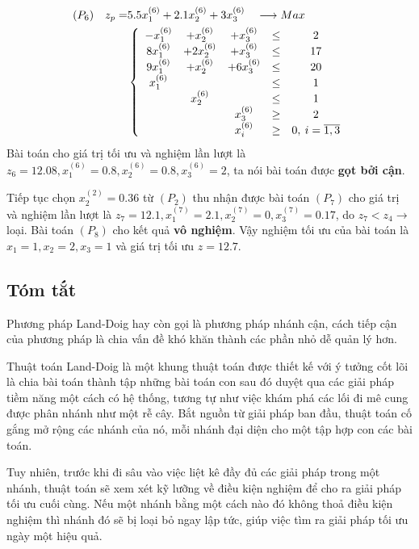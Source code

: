 \documentclass[12pt,a4paper]{report}
\begin{document}
    \begin{equation*}
      \begin{split}
          (P_6) \quad z_p= & 5.5x^{(6)}_1 + 2.1x^{(6)}_2 + 3x^{(6)}_3 \quad \longrightarrow Max \\
          & \left\{\begin{array} {ccccc}
           -x^{(6)}_1 &+ x^{(6)}_2 &+ x^{(6)}_3 &\leq& 2 \\
           8x^{(6)}_1 &+ 2x^{(6)}_2 &+ x^{(6)}_3&\leq &17 \\
           9x^{(6)}_1 &+ x^{(6)}_2 &+ 6x^{(6)}_3 &\leq& 20 \\
           x^{(6)}_1&& &\leq& 1 \\
           &x^{(6)}_2& &\leq& 1 \\
           &&x^{(6)}_3& \geq &2 \\
          &&x^{(6)}_i &\geq &0 , \: i=\overline{\rm 1 ,3} \\
          \end{array}\right. \\
      \end{split}
    \end{equation*}
    Bài toán cho giá trị tối ưu và nghiệm lần lượt là  $z_6=12.08, x^{(6)}_1=0.8, x^{(6)}_2=0.8, x^{(6)}_3=2$, ta nói bài toán được \textbf{gọt bởi cận}.
    
Tiếp tục chọn $x^{(2)}_2=0.36$ từ $(P_2)$ thu nhận được bài toán $(P_7)$ cho giá trị và nghiệm lần lượt là $z_7=12.1, x^{(7)}_1=2.1, x^{(7)}_2=0, x^{(7)}_3=0.17$, do $z_7<z_4 \rightarrow$ loại. Bài toán $(P_8)$ cho kết quả \textbf{vô nghiệm}. Vậy nghiệm tối ưu của bài toán là $x_1=1, x_2=2, x_3=1$ và giá trị tối ưu $z=12.7$.
\subsection*{Tóm tắt}
Phương pháp Land-Doig hay còn gọi là phương pháp nhánh cận, cách tiếp cận của phương pháp là chia vấn đề khó khăn thành các phần nhỏ dễ quản lý hơn.

Thuật toán Land-Doig là một khung thuật toán được thiết kế với ý tưởng cốt lõi là chia bài toán thành tập những bài toán con sau đó duyệt qua các giải pháp tiềm năng một cách có hệ thống, tương tự như việc khám phá các lối đi mê cung được phân nhánh như một rễ cây. Bắt nguồn từ giải pháp ban đầu, thuật toán cố gắng mở rộng các nhánh của nó, mỗi nhánh đại diện cho một tập hợp con các bài toán.

Tuy nhiên, trước khi đi sâu vào việc liệt kê đầy đủ các giải pháp trong một nhánh, thuật toán sẽ xem xét kỹ lưỡng về điều kiện nghiệm để cho ra giải pháp tối ưu cuối cùng. Nếu một nhánh bằng một cách nào đó không thoả điều kiện nghiệm thì nhánh đó sẽ bị loại bỏ ngay lập tức, giúp việc tìm ra giải pháp tối ưu ngày một hiệu quả.
        
\end{document}
